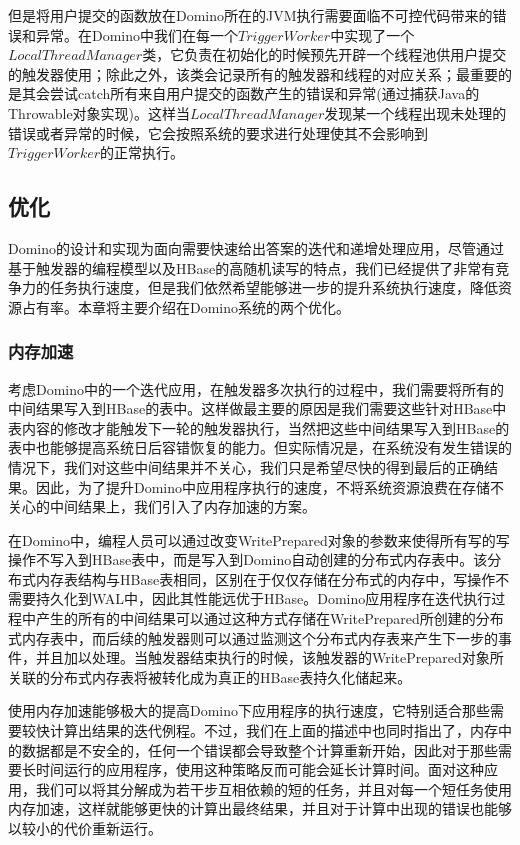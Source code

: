 但是将用户提交的函数放在Domino所在的JVM执行需要面临不可控代码带来的错误和异常。在Domino中我们在每一个$TriggerWorker$中实现了一个$LocalThreadManager$类，它负责在初始化的时候预先开辟一个线程池供用户提交的触发器使用；除此之外，该类会记录所有的触发器和线程的对应关系；最重要的是其会尝试catch所有来自用户提交的函数产生的错误和异常(通过捕获Java的Throwable对象实现)。这样当$LocalThreadManager$发现某一个线程出现未处理的错误或者异常的时候，它会按照系统的要求进行处理使其不会影响到$TriggerWorker$的正常执行。

\subsection{优化}
Domino的设计和实现为面向需要快速给出答案的迭代和递增处理应用，尽管通过基于触发器的编程模型以及HBase的高随机读写的特点，我们已经提供了非常有竞争力的任务执行速度，但是我们依然希望能够进一步的提升系统执行速度，降低资源占有率。本章将主要介绍在Domino系统的两个优化。

\subsubsection{内存加速}
考虑Domino中的一个迭代应用，在触发器多次执行的过程中，我们需要将所有的中间结果写入到HBase的表中。这样做最主要的原因是我们需要这些针对HBase中表内容的修改才能触发下一轮的触发器执行，当然把这些中间结果写入到HBase的表中也能够提高系统日后容错恢复的能力。但实际情况是，在系统没有发生错误的情况下，我们对这些中间结果并不关心，我们只是希望尽快的得到最后的正确结果。因此，为了提升Domino中应用程序执行的速度，不将系统资源浪费在存储不关心的中间结果上，我们引入了内存加速的方案。

在Domino中，编程人员可以通过改变WritePrepared对象的参数来使得所有写的写操作不写入到HBase表中，而是写入到Domino自动创建的分布式内存表中。该分布式内存表结构与HBase表相同，区别在于仅仅存储在分布式的内存中，写操作不需要持久化到WAL中，因此其性能远优于HBase。Domino应用程序在迭代执行过程中产生的所有的中间结果可以通过这种方式存储在WritePrepared所创建的分布式内存表中，而后续的触发器则可以通过监测这个分布式内存表来产生下一步的事件，并且加以处理。当触发器结束执行的时候，该触发器的WritePrepared对象所关联的分布式内存表将被转化成为真正的HBase表持久化储起来。

使用内存加速能够极大的提高Domino下应用程序的执行速度，它特别适合那些需要较快计算出结果的迭代例程。不过，我们在上面的描述中也同时指出了，内存中的数据都是不安全的，任何一个错误都会导致整个计算重新开始，因此对于那些需要长时间运行的应用程序，使用这种策略反而可能会延长计算时间。面对这种应用，我们可以将其分解成为若干步互相依赖的短的任务，并且对每一个短任务使用内存加速，这样就能够更快的计算出最终结果，并且对于计算中出现的错误也能够以较小的代价重新运行。

